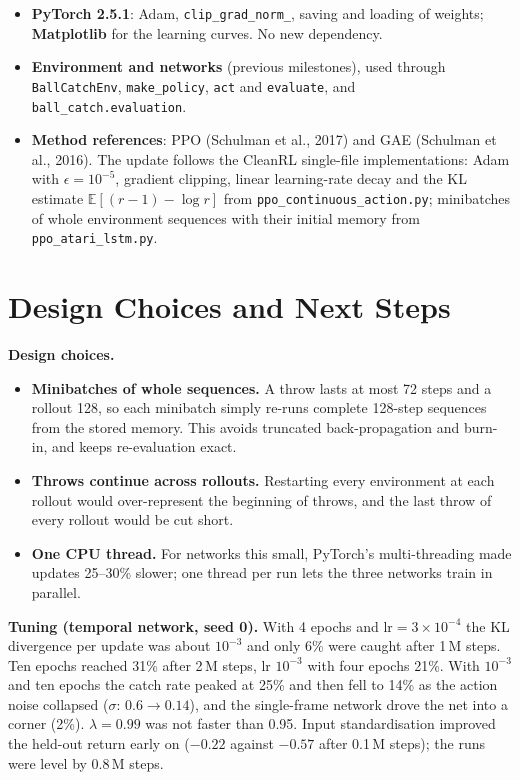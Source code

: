 \documentclass[10pt,a4paper]{article}
\newcommand{\code}[1]{\texttt{#1}}
\begin{document}
\begin{itemize}
  \item \textbf{PyTorch 2.5.1}: Adam, \code{clip\_grad\_norm\_}, saving and loading of weights;
        \textbf{Matplotlib} for the learning curves. No new dependency.
  \item \textbf{Environment and networks} (previous milestones), used through \code{BallCatchEnv},
        \code{make\_policy}, \code{act} and \code{evaluate}, and \code{ball\_catch.evaluation}.
  \item \textbf{Method references}: PPO (Schulman et al., 2017) and GAE (Schulman et al., 2016). The
        update follows the CleanRL single-file implementations: Adam with $\epsilon = 10^{-5}$,
        gradient clipping, linear learning-rate decay and the KL estimate $\mathbb{E}[(r-1)-\log r]$
        from \code{ppo\_continuous\_action.py}; minibatches of whole environment sequences with their
        initial memory from \code{ppo\_atari\_lstm.py}.
\end{itemize}

\section{Design Choices and Next Steps}

\textbf{Design choices.}
\begin{itemize}
  \item \textbf{Minibatches of whole sequences.} A throw lasts at most 72 steps and a rollout 128, so each
        minibatch simply re-runs complete 128-step sequences from the stored memory. This avoids truncated
        back-propagation and burn-in, and keeps re-evaluation exact.
  \item \textbf{Throws continue across rollouts.} Restarting every environment at each rollout would
        over-represent the beginning of throws, and the last throw of every rollout would be cut short.
  \item \textbf{One CPU thread.} For networks this small, PyTorch's multi-threading made updates 25--30\%
        slower; one thread per run lets the three networks train in parallel.
\end{itemize}

\textbf{Tuning (temporal network, seed 0).} With 4 epochs and $\text{lr}=3\times10^{-4}$ the KL divergence per
update was about $10^{-3}$ and only 6\% were caught after 1\,M steps. Ten epochs reached 31\% after 2\,M steps,
lr $10^{-3}$ with four epochs 21\%. With $10^{-3}$ and ten epochs the catch rate peaked at 25\% and then fell
to 14\% as the action noise collapsed ($\sigma$: $0.6 \to 0.14$), and the single-frame network drove the net
into a corner (2\%). $\lambda = 0.99$ was not faster than 0.95. Input standardisation improved the held-out
return early on ($-0.22$ against $-0.57$ after 0.1\,M steps); the runs were level by 0.8\,M steps.
\end{document}
